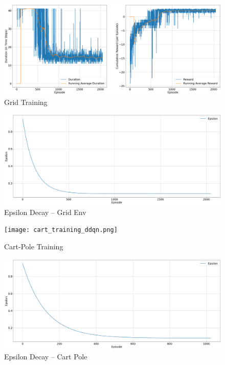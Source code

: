 \documentclass{article} %
\begin{document}
\begin{figure}[H]
    \begin{center}
        \includegraphics[width=\textwidth]{grid_training_ddqn.png}
    \end{center}
    \caption{Grid Training}
\end{figure}

\begin{figure}[H]
    \begin{center}
        \includegraphics[width=\textwidth]{eps_grid_ddqn.png}
    \end{center}
    \caption{Epsilon Decay -- Grid Env}
\end{figure}

\begin{figure}[H]
    \begin{center}
        \texttt{[image: cart\_training\_ddqn.png]}
    \end{center}
    \caption{Cart-Pole Training}
\end{figure}

\begin{figure}[H]
    \begin{center}
        \includegraphics[width=\textwidth]{eps_cart.png}
    \end{center}
    \caption{Epsilon Decay -- Cart Pole}
\end{figure}
\end{document}
